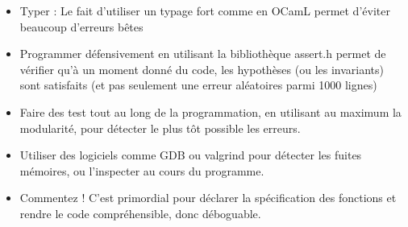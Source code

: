 \begin{itemize}[label=$\star$]
	\item Typer : Le fait d'utiliser un typage fort comme en OCamL permet d'éviter beaucoup d'erreurs bêtes
	\item Programmer défensivement en utilisant la bibliothèque assert.h permet de vérifier qu'à un moment donné du code, les hypothèses (ou les invariants) sont satisfaits (et pas seulement une erreur aléatoires parmi 1000 lignes)
	\item Faire des test tout au long de la programmation, en utilisant au maximum la modularité, pour détecter le plus tôt possible les erreurs.
	\item Utiliser des logiciels comme GDB ou valgrind pour détecter les fuites mémoires, ou l'inspecter au cours du programme.
	\item Commentez ! C'est primordial pour déclarer la spécification des fonctions et rendre le code compréhensible, donc déboguable.
\end{itemize}